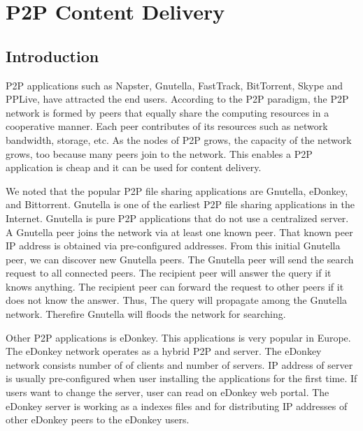\chapter{P2P Content Delivery}
\section{Introduction}

P2P applications such as Napster, Gnutella, FastTrack, BitTorrent, Skype and PPLive, have attracted the end users.
According to the P2P paradigm, the P2P network is formed by peers that equally share the computing resources in a cooperative manner.
Each peer contributes of its resources such as network bandwidth, storage, etc. 
As the nodes of P2P grows, the capacity of the network grows, too because many peers join to the network. 
This enables a P2P application is cheap and it can be used for content delivery.  

We noted that the popular P2P file sharing applications are Gnutella, eDonkey, and Bittorrent.  
Gnutella is one of the earliest P2P file sharing applications in the Internet.
Gnutella is pure P2P applications that do not use a centralized server.
A Gnutella peer joins the network via at least one known peer.
That known peer IP address is obtained via pre-configured addresses. 
From this initial Gnutella peer, we can discover new Gnutella peers.
The Gnutella peer will send the search request to all connected peers. 
The recipient peer will answer the query if it knows anything. 
The recipient peer can forward the request to other peers if it does not know the answer.
Thus, The query will propagate among the Gnutella network.
Therefire Gnutella will floods the network for searching.

Other P2P applications is eDonkey.  
This applications is very popular in Europe. 
The eDonkey network operates as a hybrid P2P and server. 
The eDonkey network consists number of of clients and number of servers. 
IP address of server is usually pre-configured when user installing the applications for the first time.  
If users want to change the server, user can read on eDonkey web portal.
The eDonkey server is working as a indexes files and for distributing IP addresses of other eDonkey peers to the eDonkey users.

